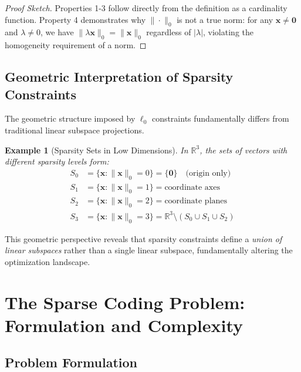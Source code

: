 \documentclass[12pt]{article}
\newtheorem{example}[theorem]{Example}
\begin{document}
\begin{proof}[Proof Sketch]
    Properties 1-3 follow directly from the definition as a cardinality function. Property 4 demonstrates why $\|\cdot\|_0$ is not a true norm: for any $\mathbf{x} \neq \mathbf{0}$ and $\lambda \neq 0$, we have $\|\lambda\mathbf{x}\|_0 = \|\mathbf{x}\|_0$ regardless of $|\lambda|$, violating the homogeneity requirement of a norm.
\end{proof}

\subsection{Geometric Interpretation of Sparsity Constraints}

The geometric structure imposed by $\ell_0$ constraints fundamentally differs from traditional linear subspace projections.

\begin{example}[Sparsity Sets in Low Dimensions]\label{ex:sparsity_geometry}
    In $\mathbb{R}^3$, the sets of vectors with different sparsity levels form:
    \begin{align}
        S_0 & = \{\mathbf{x} : \|\mathbf{x}\|_0 = 0\} = \{\mathbf{0}\} \quad \text{(origin only)}      \\
        S_1 & = \{\mathbf{x} : \|\mathbf{x}\|_0 = 1\} = \text{coordinate axes}                         \\
        S_2 & = \{\mathbf{x} : \|\mathbf{x}\|_0 = 2\} = \text{coordinate planes}                       \\
        S_3 & = \{\mathbf{x} : \|\mathbf{x}\|_0 = 3\} = \mathbb{R}^3 \setminus (S_0 \cup S_1 \cup S_2)
    \end{align}
\end{example}

This geometric perspective reveals that sparsity constraints define a \textit{union of linear subspaces} rather than a single linear subspace, fundamentally altering the optimization landscape.

\newpage

\section{The Sparse Coding Problem: Formulation and Complexity}

\subsection{Problem Formulation}
\end{document}
